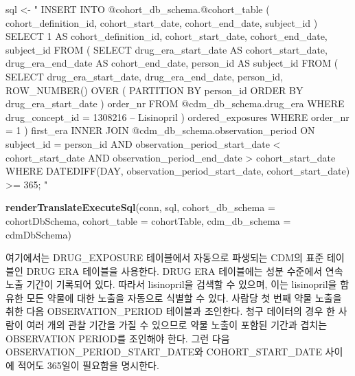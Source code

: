 \documentclass[10.5pt]{book}
\newenvironment{Shaded}{\begin{snugshade}}{\end{snugshade}}
\newcommand{\KeywordTok}[1]{\textcolor[rgb]{0.13,0.29,0.53}{\textbf{#1}}}
\newcommand{\DataTypeTok}[1]{\textcolor[rgb]{0.13,0.29,0.53}{#1}}
\newcommand{\StringTok}[1]{\textcolor[rgb]{0.31,0.60,0.02}{#1}}
\newcommand{\NormalTok}[1]{#1}
\theoremstyle{definition}
\theoremstyle{definition}
\theoremstyle{definition}
\theoremstyle{remark}
\begin{document}
\begin{Shaded}
\begin{Highlighting}[]
\NormalTok{sql <-}\StringTok{ "}
\StringTok{INSERT INTO @cohort_db_schema.@cohort_table (}
\StringTok{  cohort_definition_id,}
\StringTok{  cohort_start_date,}
\StringTok{  cohort_end_date,}
\StringTok{  subject_id}
\StringTok{)}
\StringTok{SELECT 1 AS cohort_definition_id,}
\StringTok{  cohort_start_date,}
\StringTok{  cohort_end_date,}
\StringTok{  subject_id}
\StringTok{FROM (}
\StringTok{  SELECT drug_era_start_date AS cohort_start_date,}
\StringTok{    drug_era_end_date AS cohort_end_date,}
\StringTok{    person_id AS subject_id}
\StringTok{  FROM (}
\StringTok{    SELECT drug_era_start_date,}
\StringTok{      drug_era_end_date,}
\StringTok{      person_id,}
\StringTok{      ROW_NUMBER() OVER (}
\StringTok{        PARTITION BY person_id}
\StringTok{            ORDER BY drug_era_start_date}
\StringTok{      ) order_nr}
\StringTok{    FROM @cdm_db_schema.drug_era}
\StringTok{    WHERE drug_concept_id = 1308216 -- Lisinopril}
\StringTok{  ) ordered_exposures}
\StringTok{  WHERE order_nr = 1}
\StringTok{) first_era}
\StringTok{INNER JOIN @cdm_db_schema.observation_period}
\StringTok{  ON subject_id = person_id}
\StringTok{    AND observation_period_start_date < cohort_start_date}
\StringTok{    AND observation_period_end_date > cohort_start_date}
\StringTok{WHERE DATEDIFF(DAY,}
\StringTok{               observation_period_start_date,}
\StringTok{               cohort_start_date) >= 365;}
\StringTok{"}

\KeywordTok{renderTranslateExecuteSql}\NormalTok{(conn, sql,}
                          \DataTypeTok{cohort_db_schema =}\NormalTok{ cohortDbSchema,}
                          \DataTypeTok{cohort_table =}\NormalTok{ cohortTable,}
                          \DataTypeTok{cdm_db_schema =}\NormalTok{ cdmDbSchema)}
\end{Highlighting}
\end{Shaded}

여기에서는 DRUG\_EXPOSURE 테이블에서 자동으로 파생되는 CDM의 표준
테이블인 DRUG ERA 테이블을 사용한다. DRUG ERA 테이블에는 성분 수준에서
연속 노출 기간이 기록되어 있다. 따라서 lisinopril을 검색할 수 있으며,
이는 lisinopril을 함유한 모든 약물에 대한 노출을 자동으로 식별할 수
있다. 사람당 첫 번째 약물 노출을 취한 다음 OBSERVATION\_PERIOD 테이블과
조인한다. 청구 데이터의 경우 한 사람이 여러 개의 관찰 기간을 가질 수
있으므로 약물 노출이 포함된 기간과 겹치는 OBSERVATION PERIOD를 조인해야
한다. 그런 다음 OBSERVATION\_PERIOD\_START\_DATE와 COHORT\_START\_DATE
사이에 적어도 365일이 필요함을 명시한다.
\end{document}

